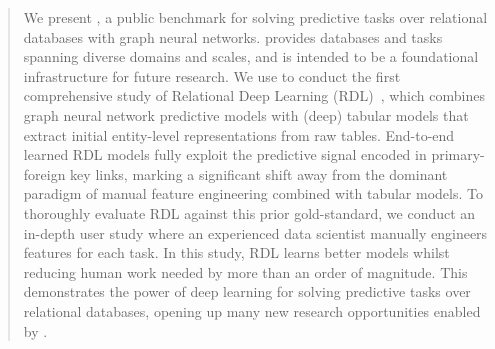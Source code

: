 \begin{abstract}
\vspace{-10pt}
 We present \relbench, a public benchmark for solving predictive tasks over relational databases with graph neural networks. \relbench provides databases and tasks spanning diverse domains and scales, and is intended to be a foundational infrastructure for future research.
We use \relbench to conduct the first comprehensive study of Relational Deep Learning (RDL)~\citep{fey2023relational}, which combines graph neural network predictive models with (deep) tabular models that extract initial entity-level representations from raw tables.
End-to-end learned RDL models fully exploit the predictive signal encoded in primary-foreign key links, marking a significant shift away from the dominant paradigm of manual feature engineering combined with tabular models. To thoroughly evaluate RDL against this prior gold-standard, we conduct an in-depth user study where an experienced data scientist manually engineers features for each task. In this study, RDL learns better models whilst reducing human work needed by more than an order of magnitude. This demonstrates the power of deep learning for solving predictive tasks over relational databases, opening up many new research opportunities enabled by \relbench. 
\end{abstract}
